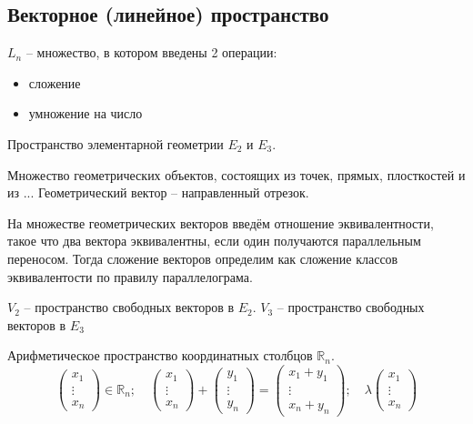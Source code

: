 \subsection{Векторное (линейное) пространство}

\begin{definition}
  $L_n$ -- множество, в котором введены 2 операции:
  \begin{itemize}
    \item сложение
    \item умножение на число
  \end{itemize}
\end{definition}

\begin{ex}
  Пространство элементарной геометрии $E_2$ и $E_3$.

  Множество геометрических объектов, состоящих из точек, прямых, плосткостей и из ... Геометрический
  вектор -- направленный отрезок.

  На множестве геометрических векторов введём отношение эквивалентности, такое что два вектора
  эквивалентны, если один получаются параллельным переносом. Тогда сложение векторов определим
  как сложение классов эквивалентости по правилу параллелограма. 

  $V_2$ -- пространство свободных векторов в $E_2$.
  $V_3$ -- пространство свободных векторов в $E_3$
\end{ex}

\begin{ex}
  Арифметическое пространство координатных столбцов $\mathbb{R}_n$.
  \[
    \begin{pmatrix}
      x_1 \\
      \vdots \\
      x_n
    \end{pmatrix} \in \mathbb{R}_n; \quad

    \begin{pmatrix}
      x_1 \\
      \vdots \\
      x_n
    \end{pmatrix} + \begin{pmatrix}
      y_1 \\
      \vdots \\
      y_n
    \end{pmatrix} = 
    \begin{pmatrix}
      x_1 + y_1 \\
      \vdots \\
      x_n + y_n
    \end{pmatrix}; \quad

    \lambda \begin{pmatrix}
      x_1 \\
      \vdots \\
      x_n
    \end{pmatrix} 
  \]
\end{ex}

